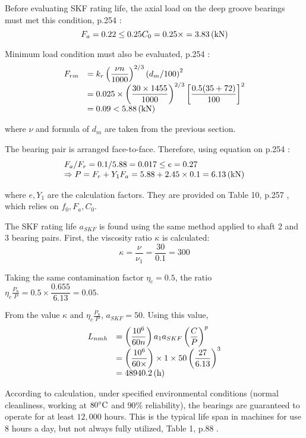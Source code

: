 Before evaluating SKF rating life, the axial load on the deep groove bearings must met this condition, p.254 \cite{rolling_bearings}:
\[
F_a = 0.22 \leq 0.25C_0 = 0.25\times  =3.83 \, (\mathrm{kN})
\]

Minimum load condition must also be evaluated, p.254 \cite{rolling_bearings}:
\[
\begin{array}{ll}
F_{rm} & = k_r\left(\dfrac{\nu n}{1000}\right)^{2/3}\left(d_m/100\right)^2\\
& = 0.025\times \left (\dfrac{30 \times 1455}{1000}\right)^{2/3} \left[\dfrac{0.5(35+72)}{100}\right]^2\\
& = 0.09<5.88\, (\mathrm{kN})
\end{array}
\]

where $ \nu $ and formula of $ d_m $ are taken from the previous section.

The bearing pair is arranged face-to-face. Therefore, using equation on p.254 \cite{rolling_bearings}:
\[
\begin{array}{l}
F_a/F_r = 0.1/5.88 = 0.017 \leq e = 0.27\\
\Rightarrow P = F_r + Y_1F_a = 5.88+2.45\times 0.1 = 6.13 \, (\mathrm{kN})
\end{array}
\]

where $ e, Y_1 $ are the calculation factors. They are provided on Table 10, p.257 \cite{rolling_bearings}, which relies on $ f_0,F_a,C_0 $.

The SKF rating life $ a_{SKF} $ is found using the same method applied to shaft 2 and 3 bearing pairs. First, the viscosity ratio $ \kappa $ is calculated:
\[
\kappa = \dfrac{\nu}{\nu_1} = \dfrac{30}{0.1} = 300
\]

Taking the same contamination factor $ \eta_c = 0.5 $, the ratio $ \eta_c \frac{P_u}{P} = 0.5\times \dfrac{0.655}{6.13} = 0.05 $.

From the value $ \kappa $ and $ \eta_c \frac{P_u}{P} $, $ a_{SKF} = 50 $. Using this value,
\[
\begin{array}{ll}
L_{nmh} & = \left(\dfrac{10^6}{60n}\right) a_1 a_{SKF} \left(\dfrac{C}{P}\right)^p\\
& = \left(\dfrac{10^6}{60\times}\right) \times 1 \times 50 \left(\dfrac{27}{6.13}\right)^3\\
& = 48940.2 \, (\mathrm{h})
\end{array}
\]

According to calculation, under specified environmental conditions (normal cleanliness, working at $ 80^\circ \text{C} $ and $ 90\% $ reliability), the bearings are guaranteed to operate for at least $ 12,000 $ hours. This is the typical life span in machines for use 8 hours a day, but not always fully utilized, Table 1, p.88 \cite{rolling_bearings}.

